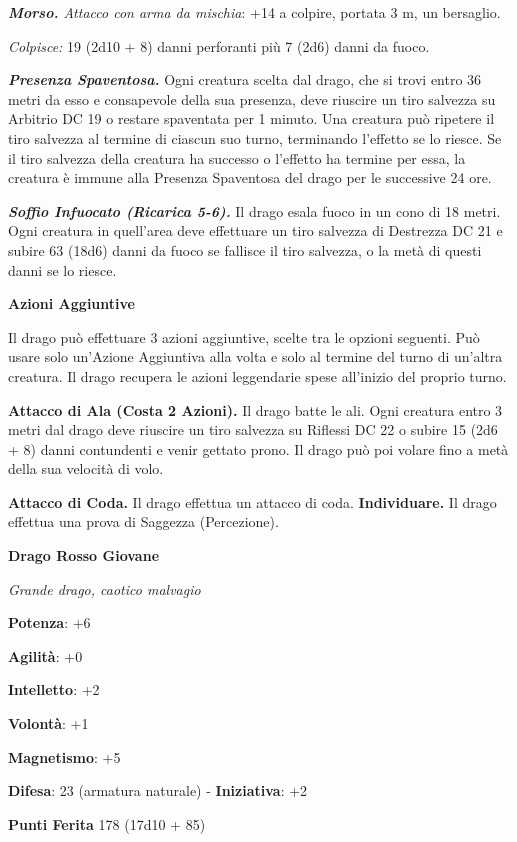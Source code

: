 \begin{multicols}{2}
\emph{\textbf{Morso.} Attacco con arma da mischia}: +14 a colpire,
portata 3 m, un bersaglio.

\emph{Colpisce:} 19 (2d10 + 8) danni perforanti più 7 (2d6) danni da
fuoco.

\emph{\textbf{Presenza Spaventosa.}} Ogni creatura scelta dal drago, che
si trovi entro 36 metri da esso e consapevole della sua presenza, deve
riuscire un tiro salvezza su Arbitrio DC 19 o restare spaventata per 1
minuto. Una creatura può ripetere il tiro salvezza al termine di ciascun
suo turno, terminando l'effetto se lo riesce. Se il tiro salvezza della
creatura ha successo o l'effetto ha termine per essa, la creatura è
immune alla Presenza Spaventosa del drago per le successive 24 ore.

\emph{\textbf{Soffio Infuocato (Ricarica 5-6).}} Il drago esala fuoco in
un cono di 18 metri. Ogni creatura in quell'area deve effettuare un tiro
salvezza di Destrezza DC 21 e subire 63 (18d6) danni da fuoco se
fallisce il tiro salvezza, o la metà di questi danni se lo riesce.

\textbf{Azioni Aggiuntive}

Il drago può effettuare 3 azioni aggiuntive, scelte tra le opzioni
seguenti. Può usare solo un'Azione Aggiuntiva alla volta e solo al
termine del turno di un'altra creatura. Il drago recupera le azioni
leggendarie spese all'inizio del proprio turno.

\textbf{Attacco di Ala (Costa 2 Azioni).} Il drago batte le ali. Ogni
creatura entro 3 metri dal drago deve riuscire un tiro salvezza su Riflessi DC 22 o subire 15 (2d6 + 8) danni contundenti e venir gettato
prono. Il drago può poi volare fino a metà della sua velocità di volo.

\textbf{Attacco di Coda.} Il drago effettua un attacco di coda.
\textbf{Individuare.} Il drago effettua una prova di Saggezza
(Percezione).



\textbf{Drago Rosso Giovane}

\emph{Grande drago, caotico malvagio}

\textbf{Potenza}: +6

\textbf{Agilità}: +0

\textbf{Intelletto}: +2

\textbf{Volontà}: +1

\textbf{Magnetismo}: +5

\textbf{Difesa}: 23 (armatura naturale) - \textbf{Iniziativa}: +2

\textbf{Punti Ferita} 178 (17d10 + 85)


\end{multicols}
